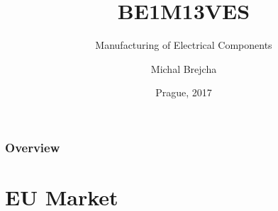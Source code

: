 \documentclass{beamer}
\title[BE1M13VES]{BE1M13VES}
\subtitle[Manufacturing of Electrical Components] {Manufacturing of Electrical Components}
\author[Brejcha]{Michal Brejcha}
\institute[CTU]{CTU in Prague}
\date[Prague, 2017]{Prague, 2017}
\begin{document}
\frame{\titlepage}

\begin{frame}
\frametitle{Overview} 
\tableofcontents
\end{frame}


\section{\texorpdfstring{EU Market}{EU Market}}
\end{document}
